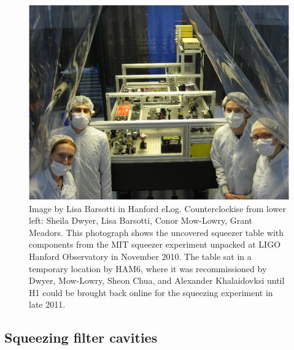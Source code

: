\begin{figure}
\begin{center}
\includegraphics[width=0.6\paperwidth]{lisabar-1289966130.eps}
\caption{Image by Lisa Barsotti in Hanford eLog.
\newline Counterclockise from lower left: Sheila Dwyer, Lisa Barsotti, Conor Mow-Lowry, Grant Meadors. This photograph shows the uncovered squeezer table with components from the MIT squeezer experiment unpacked at LIGO Hanford Observatory in November 2010. The table sat in a temporary location by HAM6, where it was recommissioned by Dwyer, Mow-Lowry, Sheon Chua, and Alexander Khalaidovksi until H1 could be brought back online for the squeezing experiment in late 2011. 
}
\label{squeezing_team_pictured}
\end{center}
\end{figure}




        \subsection{Squeezing filter cavities}
        \label{third-gen_squeezing}

